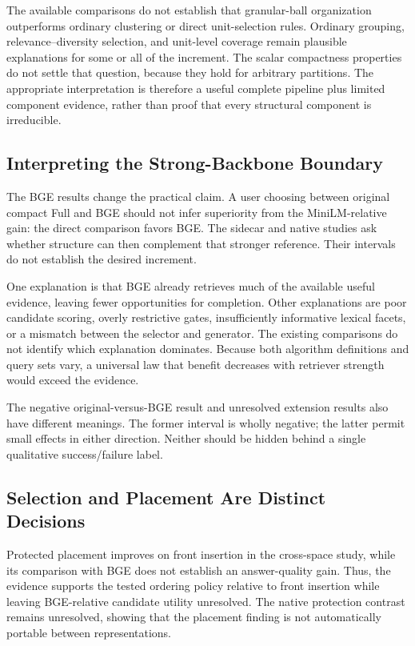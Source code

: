 \documentclass[11pt,a4paper]{article}
\begin{document}
The available comparisons do not establish that granular-ball organization
outperforms ordinary clustering or direct unit-selection rules. Ordinary
grouping, relevance--diversity selection, and unit-level coverage remain
plausible explanations for some or all of the increment.
The scalar compactness properties do not settle that
question, because they hold for arbitrary partitions. The appropriate
interpretation is therefore a useful complete pipeline plus limited
component evidence, rather than proof that every structural component is
irreducible.

\subsection{Interpreting the Strong-Backbone Boundary}
The BGE results change the practical claim. A user choosing between original
compact Full and BGE should not infer superiority from the MiniLM-relative
gain: the direct comparison favors BGE. The sidecar and native studies ask
whether structure can then complement that stronger reference. Their
intervals do not establish the desired increment.

One explanation is that BGE already retrieves much of the available useful
evidence, leaving fewer opportunities for completion. Other explanations are
poor candidate scoring, overly restrictive gates, insufficiently informative
lexical facets, or a mismatch between the selector and generator.
The existing comparisons do not identify which explanation dominates.
Because both algorithm definitions and query sets vary, a universal law that
benefit decreases with retriever strength would exceed the evidence.

The negative original-versus-BGE result and unresolved extension results
also have different meanings. The former interval is wholly negative; the
latter permit small effects in either direction. Neither should be hidden
behind a single qualitative success/failure label.

\subsection{Selection and Placement Are Distinct Decisions}
Protected placement improves on front insertion in the cross-space study,
while its comparison with BGE does not establish an answer-quality gain.
Thus, the evidence supports the tested ordering policy relative to front
insertion while leaving BGE-relative candidate utility unresolved.
The native protection contrast remains unresolved, showing that the placement
finding is not automatically portable between representations.
\end{document}
